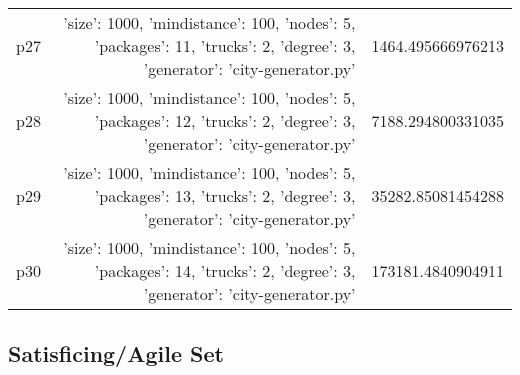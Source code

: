 \documentclass{article}
\begin{document}
\begin{center}
\begin{tabular}{r|r|r}
  p27&{'size': 1000, 'mindistance': 100, 'nodes': 5, 'packages': 11, 'trucks': 2, 'degree': 3, 'generator': 'city-generator.py'}&1464.495666976213\\
  p28&{'size': 1000, 'mindistance': 100, 'nodes': 5, 'packages': 12, 'trucks': 2, 'degree': 3, 'generator': 'city-generator.py'}&7188.294800331035\\
  p29&{'size': 1000, 'mindistance': 100, 'nodes': 5, 'packages': 13, 'trucks': 2, 'degree': 3, 'generator': 'city-generator.py'}&35282.85081454288\\
  p30&{'size': 1000, 'mindistance': 100, 'nodes': 5, 'packages': 14, 'trucks': 2, 'degree': 3, 'generator': 'city-generator.py'}&173181.4840904911
                            \end{tabular}
                            \end{center}
                    

                                \subsection*{Satisficing/Agile Set}
                                
\end{document}
